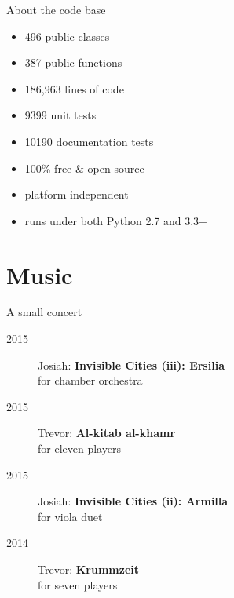 \documentclass[10pt]{beamer}
\begin{document}
\begin{frame}{About the code base}

    \begin{itemize}
        \item 496 public classes
        \item 387 public functions
        \item 186,963 lines of code
        \item 9399 unit tests
        \item 10190 documentation tests
        \item 100\% free \& open source
        \item platform independent
        \item runs under both Python 2.7 and 3.3+
    \end{itemize}

\end{frame}

\section{Music}

\begin{frame}{A small concert}
    \begin{description}
        \item[2015] Josiah: \textbf{Invisible Cities (iii): Ersilia} \\
            for chamber orchestra
        \item[2015] Trevor: \textbf{Al-kitab al-khamr} \\
            for eleven players
        \item[2015] Josiah: \textbf{Invisible Cities (ii): Armilla} \\
            for viola duet
        \item[2014] Trevor: \textbf{Krummzeit} \\
            for seven players
    \end{description}
\end{frame}
\end{document}
